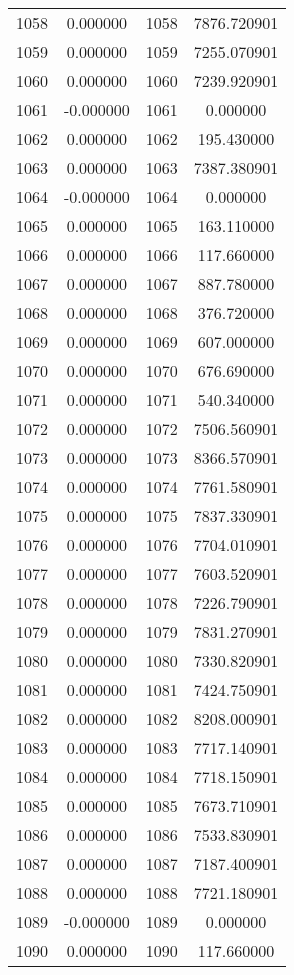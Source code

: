\documentclass[12pt]{article}
\begin{document}
\begin{longtable}{@{}cccc@{}}
1058 & 0.000000 & 1058 & 7876.720901 \\
1059 & 0.000000 & 1059 & 7255.070901 \\
1060 & 0.000000 & 1060 & 7239.920901 \\
1061 & -0.000000 & 1061 & 0.000000 \\
1062 & 0.000000 & 1062 & 195.430000 \\
1063 & 0.000000 & 1063 & 7387.380901 \\
1064 & -0.000000 & 1064 & 0.000000 \\
1065 & 0.000000 & 1065 & 163.110000 \\
1066 & 0.000000 & 1066 & 117.660000 \\
1067 & 0.000000 & 1067 & 887.780000 \\
1068 & 0.000000 & 1068 & 376.720000 \\
1069 & 0.000000 & 1069 & 607.000000 \\
1070 & 0.000000 & 1070 & 676.690000 \\
1071 & 0.000000 & 1071 & 540.340000 \\
1072 & 0.000000 & 1072 & 7506.560901 \\
1073 & 0.000000 & 1073 & 8366.570901 \\
1074 & 0.000000 & 1074 & 7761.580901 \\
1075 & 0.000000 & 1075 & 7837.330901 \\
1076 & 0.000000 & 1076 & 7704.010901 \\
1077 & 0.000000 & 1077 & 7603.520901 \\
1078 & 0.000000 & 1078 & 7226.790901 \\
1079 & 0.000000 & 1079 & 7831.270901 \\
1080 & 0.000000 & 1080 & 7330.820901 \\
1081 & 0.000000 & 1081 & 7424.750901 \\
1082 & 0.000000 & 1082 & 8208.000901 \\
1083 & 0.000000 & 1083 & 7717.140901 \\
1084 & 0.000000 & 1084 & 7718.150901 \\
1085 & 0.000000 & 1085 & 7673.710901 \\
1086 & 0.000000 & 1086 & 7533.830901 \\
1087 & 0.000000 & 1087 & 7187.400901 \\
1088 & 0.000000 & 1088 & 7721.180901 \\
1089 & -0.000000 & 1089 & 0.000000 \\
1090 & 0.000000 & 1090 & 117.660000 \\

\end{longtable}
\end{document}
